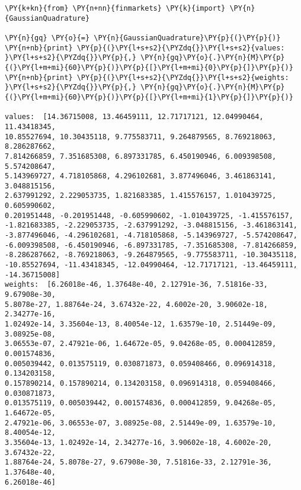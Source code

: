 \begin{tcolorbox}[breakable, size=fbox, boxrule=1pt, pad at break*=1mm,colback=cellbackground, colframe=cellborder]
\begin{Verbatim}[commandchars=\\\{\}]
\PY{k+kn}{from} \PY{n+nn}{finmarkets} \PY{k}{import} \PY{n}{GaussianQuadrature}
	
\PY{n}{gq} \PY{o}{=} \PY{n}{GaussianQuadrature}\PY{p}{(}\PY{p}{)}
\PY{n+nb}{print} \PY{p}{(}\PY{l+s+s2}{\PYZdq{}}\PY{l+s+s2}{values: }\PY{l+s+s2}{\PYZdq{}}\PY{p}{,} \PY{n}{gq}\PY{o}{.}\PY{n}{M}\PY{p}{(}\PY{l+m+mi}{60}\PY{p}{)}\PY{p}{[}\PY{l+m+mi}{0}\PY{p}{]}\PY{p}{)}
\PY{n+nb}{print} \PY{p}{(}\PY{l+s+s2}{\PYZdq{}}\PY{l+s+s2}{weights: }\PY{l+s+s2}{\PYZdq{}}\PY{p}{,} \PY{n}{gq}\PY{o}{.}\PY{n}{M}\PY{p}{(}\PY{l+m+mi}{60}\PY{p}{)}\PY{p}{[}\PY{l+m+mi}{1}\PY{p}{]}\PY{p}{)}

values:  [14.36715008, 13.46459111, 12.71717121, 12.04990464, 11.43418345,
10.85527694, 10.30435118, 9.775583711, 9.264879565, 8.769218063, 8.286287662,
7.814266859, 7.351685308, 6.897331785, 6.450190946, 6.009398508, 5.574208647,
5.143969727, 4.718105868, 4.296102681, 3.877496046, 3.461863141, 3.048815156,
2.637991292, 2.229053735, 1.821683385, 1.415576157, 1.010439725, 0.605990602,
0.201951448, -0.201951448, -0.605990602, -1.010439725, -1.415576157,
-1.821683385, -2.229053735, -2.637991292, -3.048815156, -3.461863141,
-3.877496046, -4.296102681, -4.718105868, -5.143969727, -5.574208647,
-6.009398508, -6.450190946, -6.897331785, -7.351685308, -7.814266859,
-8.286287662, -8.769218063, -9.264879565, -9.775583711, -10.30435118,
-10.85527694, -11.43418345, -12.04990464, -12.71717121, -13.46459111,
-14.36715008]
weights:  [6.26018e-46, 1.37648e-40, 2.12791e-36, 7.51816e-33, 9.67908e-30,
5.8078e-27, 1.88764e-24, 3.67432e-22, 4.6002e-20, 3.90602e-18, 2.34277e-16,
1.02492e-14, 3.35604e-13, 8.40054e-12, 1.63579e-10, 2.51449e-09, 3.08925e-08,
3.06553e-07, 2.47921e-06, 1.64672e-05, 9.04268e-05, 0.000412859, 0.001574836,
0.005039442, 0.013575119, 0.030871873, 0.059408466, 0.096914318, 0.134203158,
0.157890214, 0.157890214, 0.134203158, 0.096914318, 0.059408466, 0.030871873,
0.013575119, 0.005039442, 0.001574836, 0.000412859, 9.04268e-05, 1.64672e-05,
2.47921e-06, 3.06553e-07, 3.08925e-08, 2.51449e-09, 1.63579e-10, 8.40054e-12,
3.35604e-13, 1.02492e-14, 2.34277e-16, 3.90602e-18, 4.6002e-20, 3.67432e-22,
1.88764e-24, 5.8078e-27, 9.67908e-30, 7.51816e-33, 2.12791e-36, 1.37648e-40,
6.26018e-46]
\end{Verbatim}
\end{tcolorbox}
